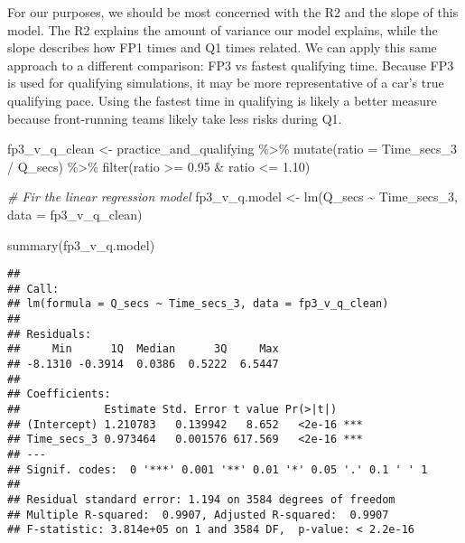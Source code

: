 \documentclass[
]{book}
\newenvironment{Shaded}{\begin{snugshade}}{\end{snugshade}}
\newcommand{\AttributeTok}[1]{\textcolor[rgb]{0.77,0.63,0.00}{#1}}
\newcommand{\CommentTok}[1]{\textcolor[rgb]{0.56,0.35,0.01}{\textit{#1}}}
\newcommand{\FloatTok}[1]{\textcolor[rgb]{0.00,0.00,0.81}{#1}}
\newcommand{\FunctionTok}[1]{\textcolor[rgb]{0.00,0.00,0.00}{#1}}
\newcommand{\NormalTok}[1]{#1}
\newcommand{\OtherTok}[1]{\textcolor[rgb]{0.56,0.35,0.01}{#1}}
\newcommand{\SpecialCharTok}[1]{\textcolor[rgb]{0.00,0.00,0.00}{#1}}
\begin{document}
For our purposes, we should be most concerned with the R2 and the slope of this model. The R2 explains the amount of variance our model explains, while the slope describes how FP1 times and Q1 times related. We can apply this same approach to a different comparison: FP3 vs fastest qualifying time. Because FP3 is used for qualifying simulations, it may be more representative of a car's true qualifying pace. Using the fastest time in qualifying is likely a better measure because front-running teams likely take less risks during Q1.

\begin{Shaded}
\begin{Highlighting}[]
\NormalTok{fp3\_v\_q\_clean }\OtherTok{\textless{}{-}}\NormalTok{ practice\_and\_qualifying }\SpecialCharTok{\%\textgreater{}\%}
  \FunctionTok{mutate}\NormalTok{(}\AttributeTok{ratio =}\NormalTok{ Time\_secs\_3 }\SpecialCharTok{/}\NormalTok{ Q\_secs) }\SpecialCharTok{\%\textgreater{}\%} 
  \FunctionTok{filter}\NormalTok{(ratio }\SpecialCharTok{\textgreater{}=} \FloatTok{0.95} \SpecialCharTok{\&}\NormalTok{ ratio }\SpecialCharTok{\textless{}=} \FloatTok{1.10}\NormalTok{)}

\CommentTok{\# Fir the linear regression model}
\NormalTok{fp3\_v\_q.model }\OtherTok{\textless{}{-}} \FunctionTok{lm}\NormalTok{(Q\_secs }\SpecialCharTok{\textasciitilde{}}\NormalTok{ Time\_secs\_3, }\AttributeTok{data =}\NormalTok{ fp3\_v\_q\_clean)}

\FunctionTok{summary}\NormalTok{(fp3\_v\_q.model)}
\end{Highlighting}
\end{Shaded}

\begin{verbatim}
## 
## Call:
## lm(formula = Q_secs ~ Time_secs_3, data = fp3_v_q_clean)
## 
## Residuals:
##     Min      1Q  Median      3Q     Max 
## -8.1310 -0.3914  0.0386  0.5222  6.5447 
## 
## Coefficients:
##             Estimate Std. Error t value Pr(>|t|)    
## (Intercept) 1.210783   0.139942   8.652   <2e-16 ***
## Time_secs_3 0.973464   0.001576 617.569   <2e-16 ***
## ---
## Signif. codes:  0 '***' 0.001 '**' 0.01 '*' 0.05 '.' 0.1 ' ' 1
## 
## Residual standard error: 1.194 on 3584 degrees of freedom
## Multiple R-squared:  0.9907, Adjusted R-squared:  0.9907 
## F-statistic: 3.814e+05 on 1 and 3584 DF,  p-value: < 2.2e-16
\end{verbatim}
\end{document}
